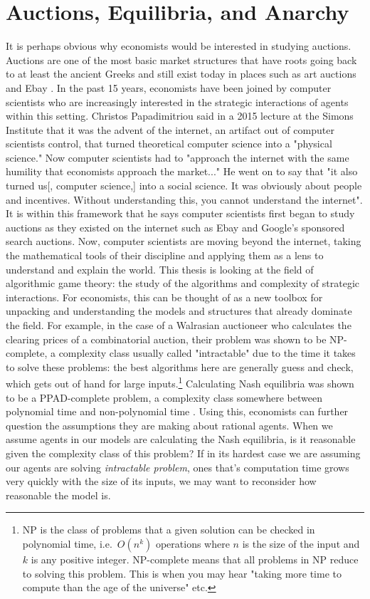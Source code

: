 \documentclass[12pt,twoside]{reedthesis}
\begin{document}
\section{Auctions, Equilibria, and Anarchy}
It is perhaps obvious why economists would be interested in studying auctions. Auctions are one of the most basic market structures that have roots going back to at least the ancient Greeks and still exist today in places such as art auctions and Ebay \citep{Mochon2015}. In the past 15 years, economists have been joined by computer scientists who are increasingly interested in the strategic interactions of agents within this setting. Christos Papadimitriou said in a 2015 lecture at the Simons Institute that it was the advent of the internet, an artifact out of computer scientists control, that turned theoretical computer science into a "physical science." Now computer scientists had to "approach the internet with the same humility that economists approach the market..." He went on to say that "it also turned us[, computer science,] into a social science. It was obviously about people and incentives. Without understanding this, you cannot understand the internet"\citep{Papadimitriou2015}. It is within this framework that he says computer scientists first began to study auctions as they existed on the internet such as Ebay and Google's sponsored search auctions. Now, computer scientists are moving beyond the internet, taking the mathematical tools of their discipline and applying them as a lens to understand and explain the world. This thesis is looking at the field of algorithmic game theory: the study of the algorithms and complexity of strategic interactions. For economists, this can be thought of as a new toolbox for unpacking and understanding the models and structures that already dominate the field. For example, in the case of a Walrasian auctioneer who calculates the clearing prices of a combinatorial auction, their problem was shown to be NP-complete, a complexity class usually called "intractable" due to the time it takes to solve these problems: the best algorithms here are generally guess and check, which gets out of hand for large inputs.\footnote{NP is the class of problems that a given solution can be checked in polynomial time, i.e.~$O(n^k)$ operations where $n$ is the size of the input and $k$ is any positive integer. NP-complete means that all problems in NP reduce to solving this problem. This is when you may hear "taking more time to compute than the age of the universe" etc.} Calculating Nash equilibria was shown to be a PPAD-complete problem, a complexity class somewhere between polynomial time and non-polynomial time \cite{Papadimitriou2015}. Using this, economists can further question the assumptions they are making about rational agents. When we assume agents in our models are calculating the Nash equilibria, is it reasonable given the complexity class of this problem? If in its hardest case we are assuming our agents are solving {\em intractable problem}, ones that's computation time grows very quickly with the size of its inputs, we may want to reconsider how reasonable the model is.
\end{document}
